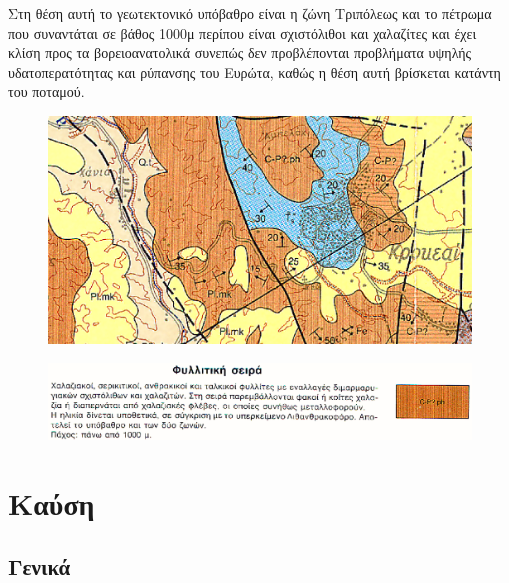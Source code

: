 \documentclass[12pt]{article}
\begin{document}
	Στη θέση αυτή το γεωτεκτονικό υπόβαθρο είναι η ζώνη Τριπόλεως και το πέτρωμα που συναντάται σε βάθος 1000μ περίπου είναι σχιστόλιθοι και χαλαζίτες και έχει κλίση προς τα βορειοανατολικά συνεπώς δεν προβλέπονται προβλήματα υψηλής υδατοπερατότητας και ρύπανσης του Ευρώτα, καθώς η θέση αυτή βρίσκεται κατάντη του ποταμού.
	
	\begin{figure} [H]
		\begin{center}
			\includegraphics [scale = 0.40] {map28.png}
		\end{center}
	\end{figure}

	\begin{figure} [H]
		\begin{center}
			\includegraphics [scale = 0.30] {map29.png}
		\end{center}
	\end{figure}

	\section{Καύση}
	
	\subsection{Γενικά}
	
\end{document}
